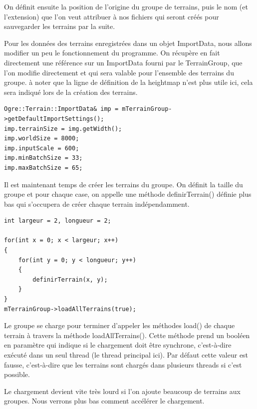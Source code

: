 On définit ensuite la position de l'origine du groupe de terrains, puis le nom (et l'extension) que l'on veut attribuer à nos fichiers qui seront créés pour sauvegarder les terrains par la suite.

Pour les données des terrains enregistrées dans un objet ImportData, nous allons modifier un peu le fonctionnement du programme. On récupère en fait directement une référence sur un ImportData fourni par le TerrainGroup, que l'on modifie directement et qui sera valable pour l'ensemble des terrains du groupe. à noter que la ligne de définition de la heightmap n'est plus utile ici, cela sera indiqué lors de la création des terrains.

\begin{lstlisting}[caption={}]
Ogre::Terrain::ImportData& imp = mTerrainGroup->getDefaultImportSettings();
imp.terrainSize = img.getWidth();
imp.worldSize = 8000;
imp.inputScale = 600;
imp.minBatchSize = 33;
imp.maxBatchSize = 65;
\end{lstlisting}

Il est maintenant temps de créer les terrains du groupe. On définit la taille du groupe et pour chaque case, on appelle une méthode definirTerrain() définie plus bas qui s'occupera de créer chaque terrain indépendamment.

\begin{lstlisting}[caption={Création des terrains du groupe}]
int largeur = 2, longueur = 2;

for(int x = 0; x < largeur; x++)
{
    for(int y = 0; y < longueur; y++)
    {
        definirTerrain(x, y);
    }
}
mTerrainGroup->loadAllTerrains(true);
\end{lstlisting}

Le groupe se charge pour terminer d'appeler les méthodes load() de chaque terrain à travers la méthode loadAllTerrains(). Cette méthode prend un booléen en paramètre qui indique si le chargement doit être synchrone, c'est-à-dire exécuté dans un seul thread (le thread principal ici). Par défaut cette valeur est fausse, c'est-à-dire que les terrains sont chargés dans plusieurs threads si c'est possible.

Le chargement devient vite très lourd si l'on ajoute beaucoup de terrains aux groupes. Nous verrons plus bas comment accélérer le chargement.

